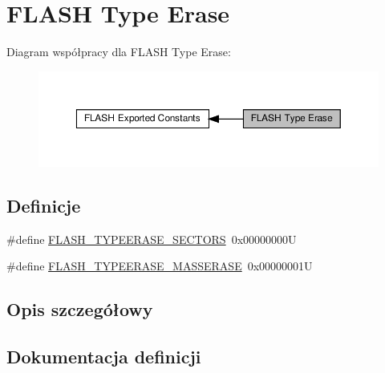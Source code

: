 \hypertarget{group___f_l_a_s_h_ex___type___erase}{}\section{F\+L\+A\+SH Type Erase}
\label{group___f_l_a_s_h_ex___type___erase}
Diagram współpracy dla F\+L\+A\+SH Type Erase\+:\nopagebreak
\begin{figure}[H]
\begin{center}
\leavevmode
\includegraphics[width=350pt]{group___f_l_a_s_h_ex___type___erase}
\end{center}
\end{figure}
\subsection*{Definicje}
\begin{DoxyCompactItemize}
\item 
\#define \hyperlink{group___f_l_a_s_h_ex___type___erase_gaee700cbbc746cf72fca3ebf07ee20c4e}{F\+L\+A\+S\+H\+\_\+\+T\+Y\+P\+E\+E\+R\+A\+S\+E\+\_\+\+S\+E\+C\+T\+O\+RS}~0x00000000U
\item 
\#define \hyperlink{group___f_l_a_s_h_ex___type___erase_ga9bc03534e69c625e1b4f0f05c3852243}{F\+L\+A\+S\+H\+\_\+\+T\+Y\+P\+E\+E\+R\+A\+S\+E\+\_\+\+M\+A\+S\+S\+E\+R\+A\+SE}~0x00000001U
\end{DoxyCompactItemize}


\subsection{Opis szczegółowy}


\subsection{Dokumentacja definicji}
\mbox{\label{group___f_l_a_s_h_ex___type___erase_ga9bc03534e69c625e1b4f0f05c3852243}} 
